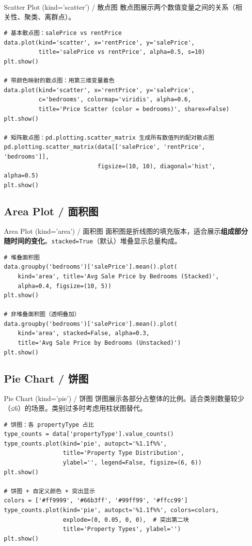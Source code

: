 \documentclass[11pt,a4paper]{report}
\let\oldtexttt\texttt
\renewcommand{\texttt}[1]{\textcolor{mainblue}{\oldtexttt{#1}}}
\begin{document}
\begin{examplebox}{Scatter Plot (kind='scatter') / 散点图}
    散点图展示两个数值变量之间的关系（相关性、聚类、离群点）。
\begin{lstlisting}
# 基本散点图：salePrice vs rentPrice
data.plot(kind='scatter', x='rentPrice', y='salePrice',
          title='salePrice vs rentPrice', alpha=0.5, s=10)
plt.show()

# 带颜色映射的散点图：用第三维变量着色
data.plot(kind='scatter', x='rentPrice', y='salePrice',
          c='bedrooms', colormap='viridis', alpha=0.6,
          title='Price Scatter (color = bedrooms)', sharex=False)
plt.show()

# 矩阵散点图：pd.plotting.scatter_matrix 生成所有数值列的配对散点图
pd.plotting.scatter_matrix(data[['salePrice', 'rentPrice', 'bedrooms']],
                           figsize=(10, 10), diagonal='hist', alpha=0.5)
plt.show()
\end{lstlisting}
\end{examplebox}

\subsection{Area Plot / 面积图}

\begin{examplebox}{Area Plot (kind='area') / 面积图}
    面积图是折线图的填充版本，适合展示\textbf{组成部分随时间的变化}。\texttt{stacked=True}（默认）堆叠显示总量构成。
\begin{lstlisting}
# 堆叠面积图
data.groupby('bedrooms')['salePrice'].mean().plot(
    kind='area', title='Avg Sale Price by Bedrooms (Stacked)',
    alpha=0.4, figsize=(10, 5))
plt.show()

# 非堆叠面积图（透明叠加）
data.groupby('bedrooms')['salePrice'].mean().plot(
    kind='area', stacked=False, alpha=0.3,
    title='Avg Sale Price by Bedrooms (Unstacked)')
plt.show()
\end{lstlisting}
\end{examplebox}

\subsection{Pie Chart / 饼图}

\begin{examplebox}{Pie Chart (kind='pie') / 饼图}
    饼图展示各部分占整体的比例。适合类别数量较少（≤6）的场景。类别过多时考虑用柱状图替代。
\begin{lstlisting}
# 饼图：各 propertyType 占比
type_counts = data['propertyType'].value_counts()
type_counts.plot(kind='pie', autopct='%1.1f%%',
                 title='Property Type Distribution',
                 ylabel='', legend=False, figsize=(6, 6))
plt.show()

# 饼图 + 自定义颜色 + 突出显示
colors = ['#ff9999', '#66b3ff', '#99ff99', '#ffcc99']
type_counts.plot(kind='pie', autopct='%1.1f%%', colors=colors,
                 explode=(0, 0.05, 0, 0),  # 突出第二块
                 title='Property Types', ylabel='')
plt.show()
\end{lstlisting}
\end{examplebox}
\end{document}

